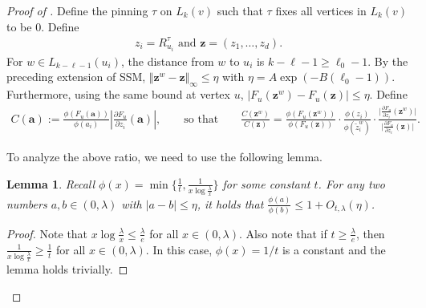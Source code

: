 \documentclass[11pt]{amsart}
\newcommand{\defeq}{:=}
\newtheorem{lemma}[theorem]{Lemma}
\theoremstyle{definition}
\theoremstyle{remark}
\begin{document}
\begin{proof}[Proof of ]
Define the pinning $\tau$ on $L_k(v)$ such that $\tau$ fixes all vertices in $L_k(v)$ to be 0. 
Define 
\begin{align*}
z_i = R_{u_i}^{\tau} \text{ and } \boldsymbol{z} = (z_1,\ldots,z_d).
\end{align*}
For $w \in L_{k-\ell-1}(u_i)$, the distance from $w$ to $u_i$ is $k - \ell-1 \geq \ell_0 - 1$. By the preceding extension of SSM, $\Vert \boldsymbol{z}^w - \boldsymbol{z} \Vert_\infty \leq \eta$ with $\eta = A \exp(-B (\ell_0 -1))$.
Furthermore, using the same bound at vertex $u$, $|F_u(\boldsymbol{z}^w) - F_u(\boldsymbol{z})| \leq \eta$. 
Define %
\begin{align}\label{eq:C-definition}
C(\boldsymbol{a}) \defeq \frac{\phi(F_u(\boldsymbol{a}))}{\phi(a_i)} \left | \frac{\partial F_u}{\partial z_i}(\boldsymbol{a}) \right |, \qquad \text{so that} \qquad \frac{C(\boldsymbol{z}^w)}{C(\boldsymbol{z})} = \frac{\phi(F_u(\boldsymbol{z}^w))}{\phi(F_u(\boldsymbol{z}))} \cdot \frac{\phi(z_i)}{\phi(\tilde{z}_i^w)} \cdot \frac{\bigl| \frac{\partial F_u}{\partial z_i}(\boldsymbol{z}^w) \bigr|}{\bigl| \frac{\partial F_u}{\partial z_i}(\boldsymbol{z}) \bigr|}.
\end{align}

To analyze the above ratio, we need to use the following lemma.
\begin{lemma}\label{lemma:phi-ratio-bound}
Recall $\phi(x) = \min \{ \frac{1}{t}, \frac{1}{x \log \frac{\lambda}{x}} \}$ %
for some constant $t$.
For any two numbers $a,b \in (0,\lambda)$ with $|a - b| \leq \eta$, it holds that $\frac{\phi(a)}{\phi(b)} \leq 1 + O_{t,\lambda} (\eta)$.
\end{lemma}
\begin{proof}
Note that $x \log \frac{\lambda}{x} \leq \frac{\lambda}{e}$ for all $x \in (0,\lambda)$.
Also note that if $t \geq \frac{\lambda}{e}$, then $\frac{1}{x \log \frac{\lambda}{x}} \geq \frac{1}{t}$ for all $x \in (0,\lambda)$. In this case, $\phi(x) = 1/t$ is a constant and the lemma holds trivially.


\end{proof}
\end{proof}
\end{document}

